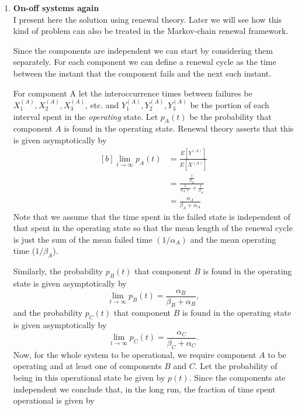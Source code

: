 \documentclass[11pt,a4paper]{article}
\begin{document}
  \begin{enumerate}
    \item \textbf{On-off systems again}\\
    I present here the solution using renewal theory. Later we will see how this kind of problem can also be treated in the Markov-chain renewal framework.\par
    Since the components are independent we can start by considering them separately. For each component we can define a renewal cycle as the time between the instant that the component fails and the next such instant.\par
    For component A let the interoccurrence times between failures be $X_1^{(A)}, X_2^{(A)}, X_3^{(A)}$, etc. and $Y_1^{(A)}, Y_2^{(A)}, Y_3^{(A)}$ be the portion of each interval spent in the \textit{operating} state. Let $p_A(t)$ be the probability that component $A$ is found in the operating state. Renewal theory asserts that this is given asymptotically by
    \begin{equation}\tag{6.1}
      \begin{aligned}[b]
        \lim_{t\to\infty}p_A(t)
        &= \frac{E[Y^{(A)}]}{E[X^{(A)}]}\\
        &= \frac{\frac{1}{\beta_A}}{\frac{1}{\alpha_A +} + \frac{1}{\beta_A}}\\
        &= \frac{\alpha_A}{\beta_A + \alpha_A}
      \end{aligned}
    \end{equation}
    Note that we assume that the time spent in the failed state is independent of that spent in the operating state so that the mean length of the renewal cycle is just the sum of the mean failed time $(1/\alpha_A)$ and the mean operating time ($1/\beta_A$).\par
    Similarly, the probability $p_B(t)$ that component $B$ is found in the operating state is given asymptotically by
    \begin{equation}\tag{6.2}
      \lim_{t\to\infty}p_B(t) = \frac{\alpha_B}{\beta_B + \alpha_B},
    \end{equation}
    and the probability $p_C(t)$ that component $B$ is found in the operating state is given asymptotically by
    \begin{equation}\tag{6.3}
      \lim_{t\to\infty} p_C(t) = \frac{\alpha_C}{\beta_C + \alpha_C}.
    \end{equation}
    Now, for the whole system to be operational, we require component $A$ to be operating and at least one of components $B$ and $C$. Let the probability of being in this operational state be given by $p(t)$. Since the components ate independent we conclude that, in the long run, the fraction of time spent operational is given by

\end{enumerate}
\end{document}
